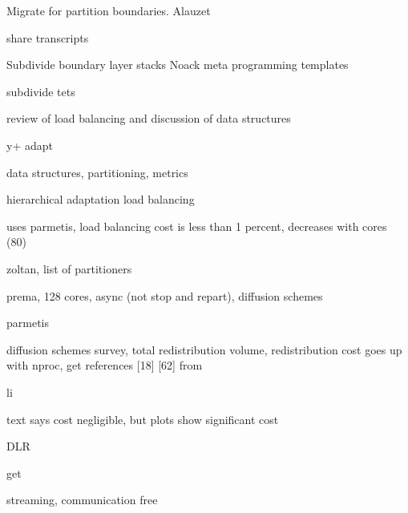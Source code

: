 \documentclass{article}
\begin{document}
Migrate for partition boundaries. 
Alauzet\cite{alauzet-li-seol-shephard-para-aniso}
\cite{kallinderis-load-balance}
\cite{lepage}
\cite{cavallo-para-adapt}
\cite{cavallo-phd-thesis}

share transcripts
\cite{park-darmofal-parallel-aniso-adapt-aiaa}
\cite{park-phd-thesis}

Subdivide boundary layer stacks
\cite{rpi-ec-2008-adapt-bl-visc}
\cite{kallinderis-adapt}
\cite{mavriplis-3d-adapt-mixed-subdivision}
\cite{lapage-habashi-3d-aniso-2002}
\cite{cavallo-phd-thesis}
\cite{kim-nakahashi-adjoint-adapt-viscous}
Noack meta programming templates\cite{noack-unstruct-mixed-adapt-template}

subdivide tets
\cite{rausch-unsteady-adaptation-3d}
\cite{waltz:2003}

review of load balancing and discussion of data structures
\cite{kavouklis-kallinderis-parallel-3d-hybrid-adapt}

y+ adapt\cite{knopp-alrutz-schwambor-adapt-grid-wall-func-rans}

data structures, partitioning, metrics
\cite{flaherty-parallel-data-structures}

hierarchical adaptation\cite{kallinderis-parallel}
load balancing\cite{minyard-kallinderis-load-balance}

uses parmetis, load balancing cost is less than 1 percent, decreases with cores (80)
\cite{eccomas-2010-para-perf-adapt}

zoltan, list of partitioners
\cite{devine-anm-2005-zoltan-load-balancing}

prema, 128 cores, async (not stop and repart), diffusion schemes
\cite{chrisochoides-ieee-tpds-2004-load-balance}

parmetis
\cite{parmetis-sc-2000}

diffusion schemes survey, total redistribution volume, redistribution cost goes up with nproc,
get references [18] [62] from
\cite{oliker-thesis}

li
\cite{li-masters-thesis,li-load-balance}

text says cost negligible, but plots show significant cost
\cite{park-para-unsteady-adapt}

DLR\cite{tau-para-adapt-hybrid-eccomas}

get
\cite{selwood}

streaming, communication free\cite{pebay-parallel-adapt}




\end{document}
